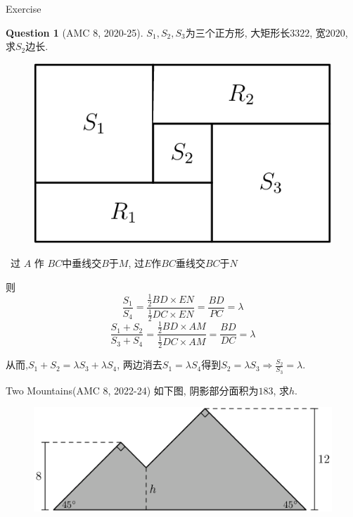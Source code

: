 \documentclass{beamer}
\theoremstyle{definition}
\newtheorem{ques}[defn]{Question}
\newenvironment{prooff}{{\noindent\it\textcolor{cyan!40!black}{Proof}:}\,}{\par}
\begin{document}
\begin{frame}{Exercise}
    \begin{ques}[AMC 8, 2020-25]
        $S_1,S_2,S_3$为三个正方形, 大矩形长$3322$, 宽$2020$, 求$S_2$边长.
        \begin{figure}
            \includegraphics[height=0.4\textheight]{rectangle1.png}
        \end{figure}
    \end{ques}
\end{frame}
\begin{frame}
    \begin{prooff}
        过 $A$ 作 $B C$中垂线交$B$于$M$, 过$E$作$BC$垂线交$BC$于$N$

        则
        $$\frac{S_1}{S_4}=\frac{\frac{1}{2} B D \times E N}{\frac{1}{2} D C \times E N}=\frac{B D}{P C}=\lambda$$
        $$
            \frac{S_1+S_2}{S_3+S_4}=\frac{\frac{1}{2} B D \times A M}{\frac{1}{2} D C \times A M}=\frac{B D}{D C}=\lambda
        $$

        从而,$S_1+S_2=\lambda S_3+\lambda S_4$, 两边消去$S_1=\lambda S_4$得到$S_2=\lambda S_3 \Rightarrow \frac{S_2}{S_3}=\lambda$.

    \end{prooff}
\end{frame}
\begin{frame}{Two Mountains(AMC 8, 2022-24)}
    如下图, 阴影部分面积为$183$, 求$h$.
    \begin{figure}
        \includegraphics[height=0.4\textheight]{two mountains.png}
    \end{figure}
\end{frame}
\end{document}
